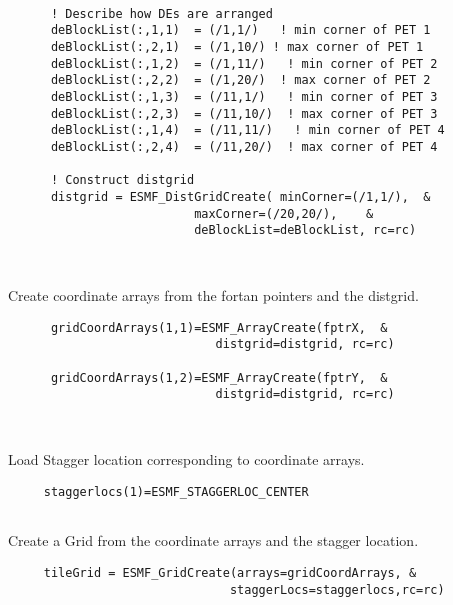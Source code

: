  \begin{verbatim}

      ! Describe how DEs are arranged
      deBlockList(:,1,1)  = (/1,1/)   ! min corner of PET 1
      deBlockList(:,2,1)  = (/1,10/) ! max corner of PET 1
      deBlockList(:,1,2)  = (/1,11/)   ! min corner of PET 2
      deBlockList(:,2,2)  = (/1,20/)  ! max corner of PET 2
      deBlockList(:,1,3)  = (/11,1/)   ! min corner of PET 3
      deBlockList(:,2,3)  = (/11,10/)  ! max corner of PET 3
      deBlockList(:,1,4)  = (/11,11/)   ! min corner of PET 4
      deBlockList(:,2,4)  = (/11,20/)  ! max corner of PET 4
      
      ! Construct distgrid
      distgrid = ESMF_DistGridCreate( minCorner=(/1,1/),  &
                          maxCorner=(/20,20/),    &
                          deBlockList=deBlockList, rc=rc)  

 
\end{verbatim}
 

    Create coordinate arrays from the fortan pointers and the distgrid.
  

 \begin{verbatim}
      gridCoordArrays(1,1)=ESMF_ArrayCreate(fptrX,  &
                             distgrid=distgrid, rc=rc)

      gridCoordArrays(1,2)=ESMF_ArrayCreate(fptrY,  &
                             distgrid=distgrid, rc=rc)

 
\end{verbatim}
 

   Load Stagger location corresponding to coordinate arrays. 

 \begin{verbatim}
     staggerlocs(1)=ESMF_STAGGERLOC_CENTER
 
\end{verbatim}
 

      Create a Grid from the coordinate arrays and the stagger location.  

 \begin{verbatim}
     tileGrid = ESMF_GridCreate(arrays=gridCoordArrays, &
                               staggerLocs=staggerlocs,rc=rc)
 
\end{verbatim}

\setlength{\parskip}{\oldparskip}
\setlength{\parindent}{\oldparindent}
\setlength{\baselineskip}{\oldbaselineskip}
